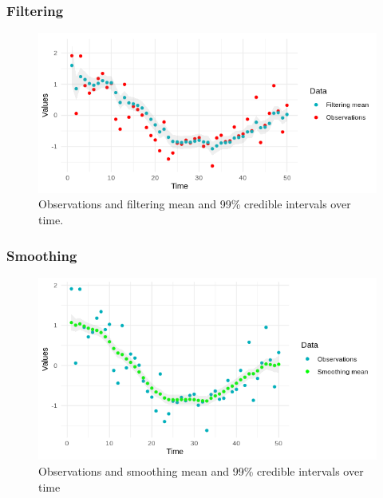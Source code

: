 \documentclass[xcolor=dvipsnames, compress]{beamer}
\begin{document}
\begin{frame}
\frametitle{Filtering}
\begin{figure}
	\includegraphics[scale=0.7]{filtermean_obs.png}
	\caption{Observations and filtering mean and 99\% credible intervals over time.}
\end{figure}
\end{frame}

\begin{frame}
\frametitle{Smoothing}
\begin{figure}
	\includegraphics[scale=0.7]{smoothmean_obs.png}
	\caption{Observations and smoothing mean and 99\% credible intervals over time}
\end{figure}
\end{frame}

%
 
\end{document}
